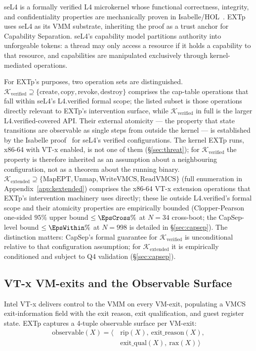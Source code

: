 \documentclass[conference]{IEEEtran}
\newcommand{\Kverified}{\mathcal{K}_\text{verified}}
\newcommand{\Kextended}{\mathcal{K}_\text{extended}}
\begin{document}
seL4 is a formally verified L4 microkernel whose functional
correctness, integrity, and confidentiality properties are
mechanically proven in
Isabelle/HOL~\cite{klein2009sel4,klein2014sel4}. EXTp uses seL4 as
its VMM substrate, inheriting the proof as a trust anchor for
Capability Separation. seL4's capability model partitions authority
into unforgeable tokens: a thread may only access a resource if it
holds a capability to that resource, and capabilities are manipulated
exclusively through kernel-mediated operations.

For EXTp's purposes, two operation sets are distinguished.
$\Kverified \supseteq \{\text{create}, \text{copy}, \text{revoke},
\text{destroy}\}$ comprises the cap-table operations that fall
within seL4's L4.verified formal scope; the listed subset is
those operations directly relevant to EXTp's intervention surface,
while $\Kverified$ in full is the larger L4.verified-covered
API. Their external atomicity --- the property that state
transitions are observable as single steps from outside the
kernel --- is established by the Isabelle
proof~\cite{klein2009sel4} for seL4's verified configurations. The
kernel EXTp runs, x86-64 with VT-x enabled, is not one of them
(\S\ref{sec:threat}); for $\Kverified$ the property is therefore
inherited as an assumption about a neighbouring configuration, not
as a theorem about the running binary. $\Kextended \supseteq \{\text{MapEPT},
\text{Unmap}, \text{WriteVMCS}, \text{ReadVMCS}\}$ (full enumeration
in Appendix~\ref{app:kextended}) comprises the x86-64 VT-x extension
operations that EXTp's intervention machinery uses directly; these
lie outside L4.verified's formal scope and their atomicity properties
are empirically bounded (Clopper-Pearson one-sided $95\%$ upper bound
$\leq \EpsCross\%$ at $N{=}34$ cross-boot; the CapSep-level bound
$\leq \EpsWithin\%$ at $N{=}998$
is detailed in \S\ref{sec:capsep}). The distinction matters: CapSep's
formal guarantee for $\Kverified$ is unconditional relative to that
configuration assumption; for $\Kextended$
it is empirically conditioned and subject to Q4 validation
(\S\ref{sec:capsep}).

\subsection{VT-x VM-exits and the Observable Surface}

Intel VT-x delivers control to the VMM on every VM-exit, populating
a VMCS exit-information field with the exit reason, exit
qualification, and guest register state. EXTp captures a 4-tuple
observable surface per VM-exit:
\begin{equation}
\begin{aligned}
\text{observable}(X) = \langle\,&\text{rip}(X),\ \text{exit\_reason}(X), \\
                                &\text{exit\_qual}(X),\ \text{rax}(X)\,\rangle
\end{aligned}
\end{equation}
\end{document}
